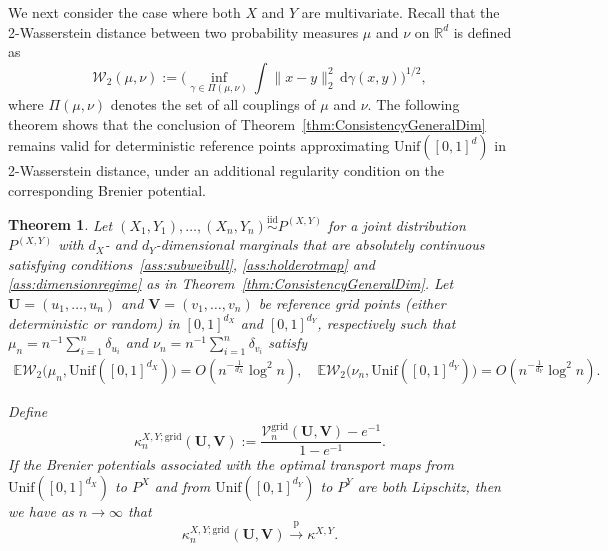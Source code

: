 \documentclass[11pt]{article}
\newtheorem{thm}{Theorem}
\newcommand{\E}{\mathbb{E}}
\newcommand{\pto}{\xrightarrow{\,\mathrm{p}\,} }
\newcommand{\iid}{\stackrel{\mathrm{iid}}\sim}
\newcommand{\bs}[1]{\boldsymbol{#1}}
\begin{document}
We next consider the case where both $X$ and $Y$ are multivariate. Recall that the 2-Wasserstein distance between two probability measures $\mu$ and $\nu$ on $\mathbb{R}^d$ is defined as
\[
\mathcal{W}_2(\mu, \nu) :=
\biggl(\inf_{\gamma\in\Pi(\mu,\nu)}
\int \|x-y\|_2^2 \, \mathrm d\gamma(x,y)\biggr)^{1/2},
\]
where $\Pi(\mu,\nu)$ denotes the set of all couplings of $\mu$ and $\nu$. The following theorem shows that the conclusion of Theorem~\ref{thm:ConsistencyGeneralDim} remains valid for deterministic reference points approximating $\mathrm{Unif}([0, 1]^d)$ in 2-Wasserstein distance, under an additional regularity condition on the corresponding Brenier potential.  

\begin{thm}
    \label{Thm:ConsistencyGeneralDimGrid}
    Let $(X_1,Y_1),\ldots, (X_n,Y_n)\iid P^{(X,Y)}$ for a joint distribution $P^{(X,Y)}$ with $d_X$- and $d_Y$-dimensional marginals that are absolutely continuous satisfying conditions~\ref{ass:subweibull}, \ref{ass:holderotmap} and \ref{ass:dimensionregime} as in Theorem~\ref{thm:ConsistencyGeneralDim}. Let $\bs U=(u_1,\ldots,u_n)$ and $\bs V=(v_1,\ldots,v_n)$ be reference grid points (either deterministic or random) in $[0,1]^{d_X}$ and $[0,1]^{d_Y}$, respectively such that $\mu_n=n^{-1}\sum_{i=1}^n\delta_{u_i}$ and $\nu_n=n^{-1}\sum_{i=1}^n\delta_{v_i}$ satisfy
\begin{equation}\label{eq:UniformApprox}
    \begin{aligned}
    \E\mathcal{W}_2\bigl(\mu_n, \mathrm{Unif}([0,1]^{d_X})\bigr) = O(n^{-\frac{1}{d_X}}\log^2 n), \!\! \quad \E\mathcal{W}_2\bigl(\nu_n, \mathrm{Unif}([0,1]^{d_Y})\bigr) = O(n^{-\frac{1}{d_Y}}\log^2 n). 
\end{aligned}
\end{equation}

Define 
\[  
\kappa_n^{X,Y;\mathrm{grid}}(\bs{U},\bs{V}) := \frac{\mathcal{V}_n^{\mathrm{grid}}(\bs{U},\bs{V}) -e^{-1}}{1-e^{-1}}.
\]
If the Brenier potentials associated with the optimal transport maps from $\mathrm{Unif}([0,1]^{d_X})$ to $P^{X}$ and from $\mathrm{Unif}([0,1]^{d_Y})$ to $P^{Y}$ are both Lipschitz, then we have as $n\to\infty$ that 
\[  
\kappa_n^{X,Y;\mathrm{grid}}(\bs{U},\bs{V}) \pto \kappa^{X,Y}.
\]
\end{thm}
\end{document}
